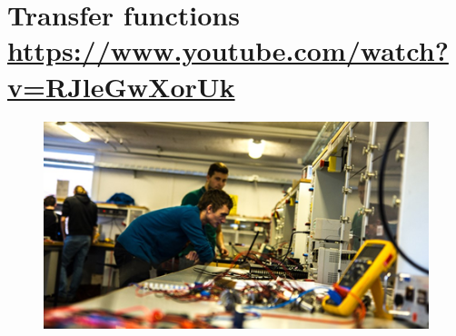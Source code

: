\documentclass[
	12pt, %
]{fphw}
\begin{document}
\newpage
\section*{{\color{RoyalPurple}Transfer functions} \url{https://www.youtube.com/watch?v=RJleGwXorUk}}

\begin{figure}[H]
  \centering
  \includegraphics[scale=0.3]{images/control_ing.jpg}
\end{figure}
\end{document}
